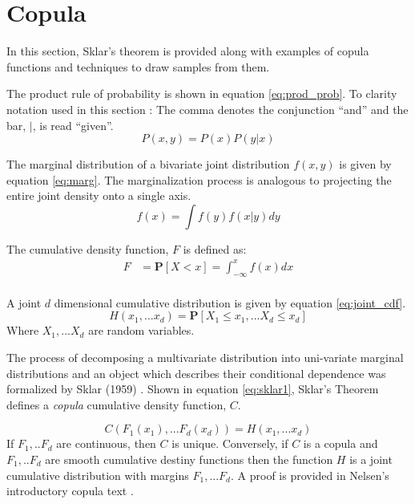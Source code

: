 \section{Copula}

In this section, Sklar's theorem is provided along with examples of copula functions
and techniques to draw samples from them. 

The product rule of probability is shown in equation \ref{eq:prod_prob}.  To clarity notation used in this section : The comma denotes the conjunction ``and'' and the bar, $|$, is read ``given''.
\begin{equation}
P(x, y) = P(x) P(y | x)
\label{eq:prod_prob}
\end{equation}

The marginal distribution of a bivariate joint distribution $f(x, y)$ is given by equation \ref{eq:marg}.  The marginalization process is analogous to projecting the entire joint density onto a single axis.
\begin{equation}
f(x) = \int f(y) f(x|y) dy
\label{eq:marg}
\end{equation}

The cumulative density function, $F$ is defined as:
\begin{align*} 
F &= \mathbf{P}[X < x] = \int_{-\infty}^x f(x)dx \\
\end{align*}

A joint $d$ dimensional cumulative distribution is given by equation \ref{eq:joint_cdf}.
\begin{equation}
H(x_1, ... x_d) = \mathbf P[X_1 \leq x_1, ... X_d \leq x_d]
\label{eq:joint_cdf}
\end{equation}
Where $X_1, ... X_d$ are random variables.

The process of decomposing a multivariate distribution into uni-variate marginal
distributions and an object which describes their conditional dependence was
formalized by Sklar (1959) \cite{Sklar1959}.  Shown in equation \ref{eq:sklar1},  Sklar's Theorem
defines a \emph{copula} cumulative density function, $C$.

\begin{equation}
C(F_1(x_1), ... F_d(x_d)) = H(x_1, ... x_d)
\label{eq:sklar1}
\end{equation}
If $F_1, .. F_d$ are continuous, then $C$ is unique.  Conversely, if $C$ is a copula and $F_1, .. F_d$ are smooth cumulative destiny functions then the function $H$ is a joint cumulative distribution with margins $F_1, ... F_d$.  A proof is provided in Nelsen's introductory copula text \cite{Nelsen2006}.

